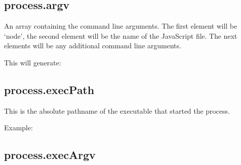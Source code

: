 \subsection{process.argv}

An array containing the command line arguments. The first element will
be `node', the second element will be the name of the JavaScript file.
The next elements will be any additional command line arguments.

\begin{Shaded}
\begin{Highlighting}[]
\NormalTok{(}
   
\NormalTok{\});}
\end{Highlighting}
\end{Shaded}

This will generate:

\begin{Shaded}
\begin{Highlighting}[]
\NormalTok{: }\OtherTok{/}\OtherTok{/}
\end{Highlighting}
\end{Shaded}

\subsection{process.execPath}

This is the absolute pathname of the executable that started the
process.

Example:

\begin{Shaded}
\begin{Highlighting}[]
\end{Highlighting}
\end{Shaded}

\subsection{process.execArgv}


